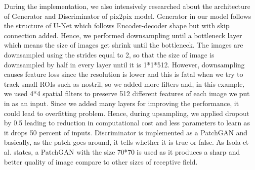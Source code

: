 \documentclass[conference]{IEEEtran}
\begin{document}
During the implementation, we also intensively researched about the architecture of Generator and Discriminator of pix2pix model. Generator in our model follows the structure of U-Net which follows Encoder-decoder shape but with skip connection added. Hence, we performed downsampling until a bottleneck layer which means the size of images get shrink until the bottleneck. The images are downsampled using the strides equal to 2, so that the size of image is downsampled by half in every layer until it is 1*1*512. However, downsampling causes feature loss since the resolution is lower and this is fatal when we try to track small ROIs such as nostril, so we added more filters and, in this example, we used 4*4 spatial filters to preserve 512 different features of each image we put in as an input. Since we added many layers for improving the performance, it could lead to overfitting problem. Hence, during upsampling, we applied dropout by 0.5 leading to reduction in computational cost and less parameters to learn as it drops 50 percent of inputs. Discriminator is implemented as a PatchGAN and basically, as the patch goes around, it tells whether it is true or false. As Isola et al. \cite{b1} states, a PatchGAN with the size 70*70 is used as it produces a sharp and better quality of image compare to other sizes of receptive field.  \\
\end{document}
